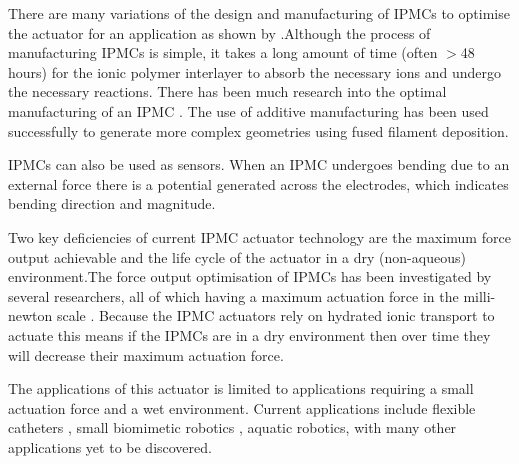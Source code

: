 There are many variations of the design and manufacturing of IPMCs to optimise the actuator for an application as shown by \cite{Shahinpoor2016}.Although the process of manufacturing IPMCs is simple, it takes a long amount of time (often $>$48 hours\citep{Ma2020}) for the ionic polymer interlayer to absorb the necessary ions and undergo the necessary reactions. There has been much research into the optimal manufacturing of an IPMC \citep{HOMMA1999,Liu1992,Shahinpoor2016}. The use of additive manufacturing has been used successfully to generate more complex geometries using fused filament deposition\citep{Carrico2015}.

IPMCs can also be used as sensors. When an IPMC undergoes bending due to an external force there is a potential generated across the electrodes, which indicates bending direction and magnitude\citep{Shahinpoor2004}.

Two key deficiencies of current IPMC actuator technology are the maximum force output achievable and the life cycle of the actuator in a dry (non-aqueous) environment.The force output optimisation of IPMCs has been investigated by several researchers, all of which having a maximum actuation force in the milli-newton scale \citep{Akle2004,Xu2014,Shahinpoor2004}. 
Because the IPMC actuators rely on hydrated ionic transport to actuate this means if the IPMCs are in a dry environment then over time they will decrease their maximum actuation force.

The applications of this actuator is limited to applications requiring a small actuation force and a wet environment. Current applications include flexible catheters \citep{Guo1994}, small biomimetic robotics \citep{Kodaira2019,Chang2013}, aquatic robotics\citep{Hubbard2014,Khawwaf2019}, with many other applications yet to be discovered.

